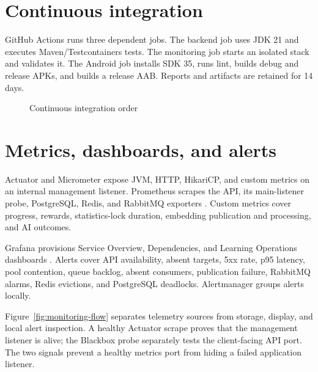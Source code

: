 \documentclass[12pt,a4paper,oneside]{report}
\begin{document}
\section{Continuous integration}
GitHub Actions runs three dependent jobs. The backend job uses JDK 21 and executes
Maven/Testcontainers tests. The monitoring job starts an isolated stack and validates
it. The Android job installs SDK 35, runs lint, builds debug and release APKs, and
builds a release AAB. Reports and artifacts are retained for 14 days.

\begin{figure}[H]\centering
{}
\caption{Continuous integration order}\label{fig:ci}
\end{figure}

\section{Metrics, dashboards, and alerts}
Actuator and Micrometer expose JVM, HTTP, HikariCP, and custom metrics on an internal
management listener. Prometheus scrapes the API, its main-listener probe, PostgreSQL,
Redis, and RabbitMQ exporters \cite{prometheus}. Custom metrics cover progress, rewards, statistics-lock
duration, embedding publication and processing, and AI outcomes.

Grafana provisions Service Overview, Dependencies, and Learning Operations dashboards
\cite{grafana}.
Alerts cover API availability, absent targets, 5xx rate, p95 latency, pool contention,
queue backlog, absent consumers, publication failure, RabbitMQ alarms, Redis evictions,
and PostgreSQL deadlocks. Alertmanager groups alerts locally.

Figure~\ref{fig:monitoring-flow} separates telemetry sources from storage, display,
and local alert inspection. A healthy Actuator scrape proves that the management listener is
alive; the Blackbox probe separately tests the client-facing API port. The two signals
prevent a healthy metrics port from hiding a failed application listener.
\end{document}

